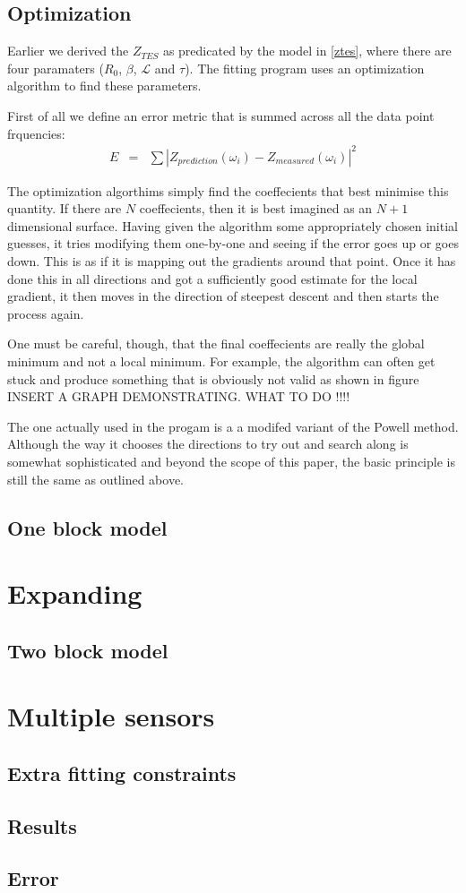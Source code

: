\documentclass[letterpaper,10pt]{article}
\begin{document}
\subsection{Optimization}
Earlier we derived the $Z_{TES}$ as predicated by the model in \eqref{ztes}, where there are four paramaters ($R_0$, $\beta$, $\mathcal{L}$ and $\tau$). The fitting program uses an optimization algorithm to find these parameters.

First of all we define an error metric that is summed across all the data point frquencies:
\begin{eqnarray}
	E &=& \sum |Z_{prediction}(\omega_i) - Z_{measured}(\omega_i)|^2
\end{eqnarray}

The optimization algorthims simply find the coeffecients that best minimise this quantity. If there are $N$ coeffecients, then it is best imagined as an $N+1$ dimensional surface. Having given the algorithm some appropriately chosen initial guesses, it tries modifying them one-by-one and seeing if the error goes up or goes down. This is as if it is mapping out the gradients around that point. Once it has done this in all directions and got a sufficiently good estimate for the local gradient, it then moves in the direction of steepest descent and then starts the process again.

One must be careful, though, that the final coeffecients are really the global minimum and not a local minimum. For example, the algorithm can often get stuck and produce something that is obviously not valid as shown in figure INSERT A GRAPH DEMONSTRATING. WHAT TO DO !!!!

The one actually used in the progam is a a modifed variant of the Powell method. Although the way it chooses the directions to try out and search along is somewhat sophisticated and beyond the scope of this paper, the basic principle is still the same as outlined above.

\subsection{One block model}


\section{Expanding}
\subsection{Two block model}

\section{Multiple sensors}
\subsection{Extra fitting constraints}
\subsection{Results}
\subsection{Error}
\end{document}
